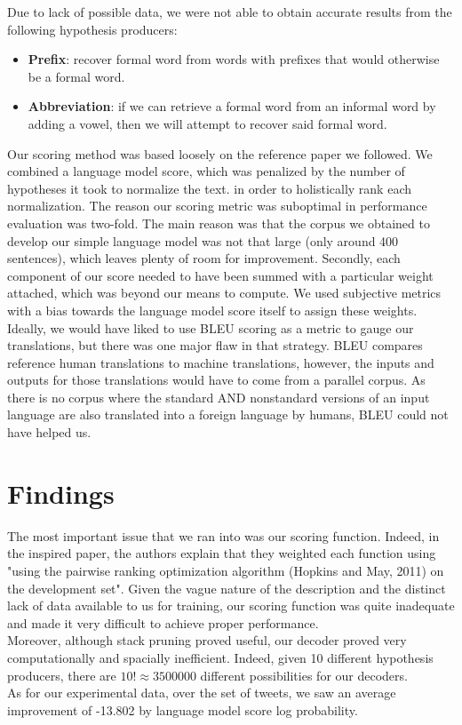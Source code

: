 \documentclass{article}
\begin{document}
Due to lack of possible data, we were not able to obtain accurate results from the following hypothesis producers:
\begin{itemize}
	\item \textbf{Prefix}: recover formal word from words with prefixes that would otherwise be a formal word.
	\item \textbf{Abbreviation}: if we can retrieve a formal word from an informal word by adding a vowel, then we will attempt to recover said formal word.
\end{itemize}

Our scoring method was based loosely on the reference paper we followed. We combined a language model score, which was penalized by the number of hypotheses it took to normalize the text. in order to holistically rank each normalization. The reason our scoring metric was suboptimal in performance evaluation was two-fold. The main reason was that the corpus we obtained to develop our simple language model was not that large (only around 400 sentences), which leaves plenty of room for improvement. Secondly, each component of our score needed to have been summed with a particular weight attached, which was beyond our means to compute. We used subjective metrics with a bias towards the language model score itself to assign these weights.
Ideally, we would have liked to use BLEU scoring as a metric to gauge our translations, but there was one major flaw in that strategy. BLEU compares reference human translations to machine translations, however, the inputs and outputs for those translations would have to come from a parallel corpus. As there is no corpus where the standard AND nonstandard versions of an input language are also translated into a foreign language by humans, BLEU could not have helped us.

\section{Findings}
The most important issue that we ran into was our scoring function. Indeed, in the inspired paper, the authors explain that they weighted each function using "using the pairwise ranking optimization algorithm (Hopkins and May, 2011) on the development set". Given the vague nature of the description and the distinct lack of data available to us for training, our scoring function was quite inadequate and made it very difficult to achieve proper performance.\\

Moreover, although stack pruning proved useful, our decoder proved very computationally and spacially inefficient. Indeed, given 10 different hypothesis producers, there are $10! \approx 3 500 000$ different possibilities for our decoders. \\

As for our experimental data, over the set of tweets, we saw an average improvement of -13.802 by language model score log probability.
\end{document}
